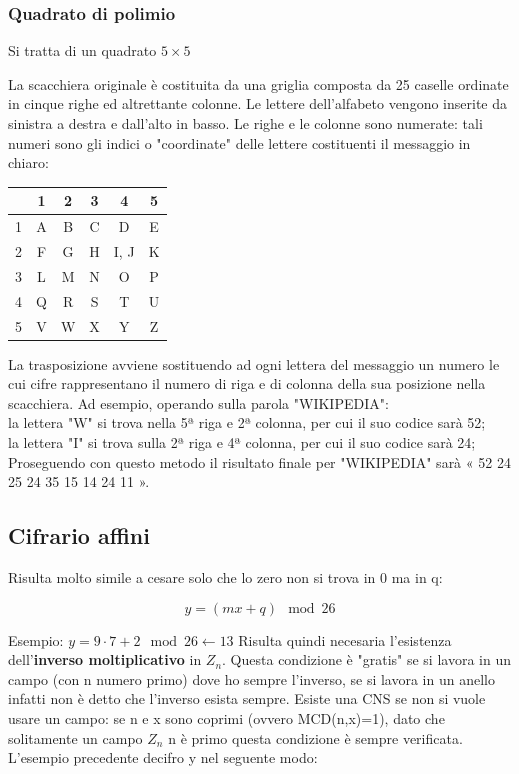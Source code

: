 \documentclass[10pt,a4paper]{article}
\begin{document}
\subsubsection{Quadrato di polimio}
Si tratta di un quadrato $5 \times 5$

La scacchiera originale è costituita da una griglia composta da 25 caselle ordinate in cinque righe ed altrettante colonne. Le lettere dell'alfabeto vengono inserite da sinistra a destra e dall'alto in basso. Le righe e le colonne sono numerate: tali numeri sono gli indici o "coordinate" delle lettere costituenti il messaggio in chiaro:
\begin{center}
\begin{tabular}{c|c|c|c|c|c|}
 & 1& 	2& 	3& 	4& 	5\\
 \hline
 1& 	A& 	B& 	C& 	D& 	E\\
 2& 	F& 	G& 	H& 	I, J& 	K\\
3& 	L& 	M& 	N& 	O& 	P\\
4& 	Q& 	R& 	S& 	T& 	U\\
5& 	V& 	W& 	X& 	Y& 	Z\\
\end{tabular}
\end{center}



La trasposizione avviene sostituendo ad ogni lettera del messaggio un numero le cui cifre rappresentano il numero di riga e di colonna della sua posizione nella scacchiera. Ad esempio, operando sulla parola "WIKIPEDIA":\\

    la lettera "W" si trova nella 5ª riga e 2ª colonna, per cui il suo codice sarà 52;\\
    la lettera "I" si trova sulla 2ª riga e 4ª colonna, per cui il suo codice sarà 24;\\

Proseguendo con questo metodo il risultato finale per "WIKIPEDIA" sarà « 52 24 25 24 35 15 14 24 11 ».
\subsection{Cifrario affini}
Risulta molto simile a cesare solo che lo zero non si trova in 0 ma in q:

$$y=(mx+q)\mod26$$

Esempio: $y=9\cdot7+2\mod26 \leftarrow13$
Risulta quindi necesaria l'esistenza dell'\textbf{inverso moltiplicativo} in $Z_n$. Questa condizione è "gratis" se si lavora in un campo (con n numero primo) dove ho sempre l'inverso, se si lavora in un anello infatti non è detto che l'inverso esista sempre. Esiste una CNS se non si vuole usare un campo: se n e x sono coprimi (ovvero MCD(n,x)=1), dato che solitamente un campo $Z_n$ n è primo questa condizione è sempre verificata.
L'esempio precedente decifro y nel seguente modo:
\end{document}
